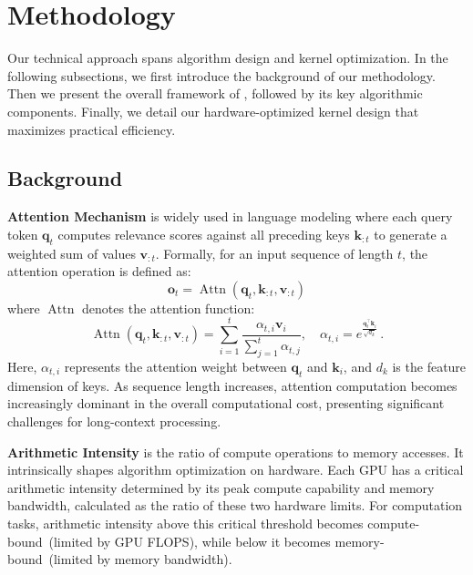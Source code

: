 \section{Methodology}

Our technical approach spans algorithm design and kernel optimization.
In the following subsections, we first introduce the background of our methodology. Then we present the overall framework of \method{}, followed by its key algorithmic components. Finally, we detail our hardware-optimized kernel design that maximizes practical efficiency.

\subsection{Background}
\textbf{Attention Mechanism} 
 is widely used in language modeling where each query token \( \mathbf{q}_t \) computes relevance scores against all preceding keys \( \mathbf{k}_{:t} \) to generate a weighted sum of values \( \mathbf{v}_{:t} \). Formally, for an input sequence of length \( t \), the attention operation is defined as:
\begin{equation}
\label{equ:attn}
    \mathbf{o}_t = \operatorname{Attn}\left(\mathbf{q}_t, \mathbf{k}_{:t}, \mathbf{v}_{:t}\right)
\end{equation}
where \( \operatorname{Attn} \) denotes the attention function:
\begin{equation}
    \operatorname{Attn}\left(\mathbf{q}_t, \mathbf{k}_{:t}, \mathbf{v}_{:t}\right) = \sum_{i=1}^t\frac{ \alpha_{t,i} \mathbf{v}_i}{\sum_{j=1}^t \alpha_{t,j}}, \quad \alpha_{t,i} = e^{\frac{\mathbf{q}_t^\top \mathbf{k}_i}{\sqrt{d_k}}}\,.
\end{equation}
Here, \( \alpha_{t,i} \) represents the attention weight between \( \mathbf{q}_t \) and \( \mathbf{k}_i \), and \( d_k \) is the feature dimension of keys. 
As sequence length increases, attention computation becomes increasingly dominant in the overall computational cost, presenting significant challenges for long-context processing.

\textbf{Arithmetic Intensity}
is the ratio of compute operations to memory accesses. It intrinsically shapes algorithm optimization on hardware. Each GPU has a critical arithmetic intensity determined by its peak compute capability and memory bandwidth, calculated as the ratio of these two hardware limits. For computation tasks, arithmetic intensity above this critical threshold becomes compute-bound~(limited by GPU FLOPS), while below it becomes memory-bound~(limited by memory bandwidth). 

